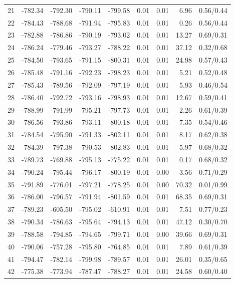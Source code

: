 \begin{tabular}{lrrrrrrrr}
21 & -782.34 & -792.30 & -790.11 & -799.58 & 0.01 & 0.01 & 6.96 & 0.56/0.44 \\
22 & -784.43 & -788.68 & -791.94 & -795.83 & 0.01 & 0.01 & 0.26 & 0.56/0.44 \\
23 & -782.88 & -786.86 & -790.19 & -793.02 & 0.01 & 0.01 & 13.27 & 0.69/0.31 \\
24 & -786.24 & -779.46 & -793.27 & -788.22 & 0.01 & 0.01 & 37.12 & 0.32/0.68 \\
25 & -784.50 & -793.65 & -791.15 & -800.31 & 0.01 & 0.01 & 24.98 & 0.57/0.43 \\
26 & -785.48 & -791.16 & -792.23 & -798.23 & 0.01 & 0.01 & 5.21 & 0.52/0.48 \\
27 & -785.43 & -789.56 & -792.09 & -797.19 & 0.01 & 0.01 & 5.93 & 0.46/0.54 \\
28 & -786.40 & -792.72 & -793.16 & -798.93 & 0.01 & 0.01 & 12.67 & 0.59/0.41 \\
29 & -788.99 & -791.99 & -795.21 & -797.73 & 0.01 & 0.01 & 2.26 & 0.61/0.39 \\
30 & -786.56 & -793.86 & -793.11 & -800.18 & 0.01 & 0.01 & 7.35 & 0.54/0.46 \\
31 & -784.54 & -795.90 & -791.33 & -802.11 & 0.01 & 0.01 & 8.17 & 0.62/0.38 \\
32 & -784.39 & -797.38 & -790.53 & -802.83 & 0.01 & 0.01 & 5.97 & 0.68/0.32 \\
33 & -789.73 & -769.88 & -795.13 & -775.22 & 0.01 & 0.01 & 0.17 & 0.68/0.32 \\
34 & -790.24 & -795.44 & -796.17 & -800.19 & 0.01 & 0.00 & 3.56 & 0.71/0.29 \\
35 & -791.89 & -776.01 & -797.21 & -778.25 & 0.01 & 0.00 & 70.32 & 0.01/0.99 \\
36 & -786.00 & -796.57 & -791.94 & -801.59 & 0.01 & 0.01 & 68.35 & 0.69/0.31 \\
37 & -789.23 & -605.50 & -795.02 & -610.91 & 0.01 & 0.01 & 7.51 & 0.77/0.23 \\
38 & -790.34 & -786.63 & -795.64 & -794.13 & 0.01 & 0.01 & 47.12 & 0.30/0.70 \\
39 & -788.58 & -794.85 & -794.65 & -799.71 & 0.01 & 0.00 & 39.66 & 0.69/0.31 \\
40 & -790.06 & -757.28 & -795.80 & -764.85 & 0.01 & 0.01 & 7.89 & 0.61/0.39 \\
41 & -794.47 & -782.14 & -799.98 & -789.57 & 0.01 & 0.01 & 26.01 & 0.35/0.65 \\
42 & -775.38 & -773.94 & -787.47 & -788.27 & 0.01 & 0.01 & 24.58 & 0.60/0.40 \\

\end{tabular}
